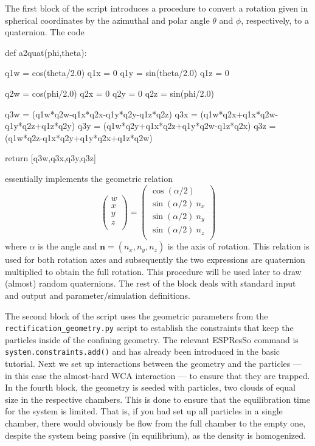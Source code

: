 \documentclass[aip,jcp,reprint,a4paper,onecolumn,amsmath]{revtex4-1}
\newcommand\code{\lstinline}
\newcommand{\es}{\mbox{\textsf{ESPResSo}}\xspace}
\newcommand\codees{\lstinline[language=python]}
\begin{document}
The first block of the script introduces a procedure to convert a rotation given in spherical coordinates by the azimuthal and polar angle $\theta$ and $\phi$, respectively, to a quaternion. The code
\begin{espresso}
def a2quat(phi,theta):

    q1w = cos(theta/2.0)
    q1x = 0
    q1y = sin(theta/2.0)
    q1z = 0

    q2w = cos(phi/2.0)
    q2x = 0
    q2y = 0
    q2z = sin(phi/2.0)

    q3w = (q1w*q2w-q1x*q2x-q1y*q2y-q1z*q2z)
    q3x = (q1w*q2x+q1x*q2w-q1y*q2z+q1z*q2y)
    q3y = (q1w*q2y+q1x*q2z+q1y*q2w-q1z*q2x)
    q3z = (q1w*q2z-q1x*q2y+q1y*q2x+q1z*q2w)

    return [q3w,q3x,q3y,q3z]
\end{espresso}
essentially implements the geometric relation
\begin{equation}
  \begin{pmatrix}
    w \\ x \\ y \\ z \\
  \end{pmatrix}
  =
  \begin{pmatrix}
    \cos(\alpha/2) \\
    \sin(\alpha/2)\ n_x \\
    \sin(\alpha/2)\ n_y \\
    \sin(\alpha/2)\ n_z \\
  \end{pmatrix}
\end{equation}
where $\alpha$ is the angle and $\mathbf{n} = (n_x,n_y,n_z)$ is the
axis of rotation. This relation is used for both rotation axes and subsequently the two expressions are quaternion multiplied to obtain the full rotation. This procedure will be used later to draw (almost) random quaternions. The rest of the block deals with standard input and output and parameter/simulation definitions.

The second block of the script uses the geometric parameters from the \code{rectification_geometry.py} script to establish the constraints that keep the particles inside of the confining geometry. The relevant \es{} command is \codees{system.constraints.add()} and has already been introduced in the basic tutorial. Next we set up interactions between the geometry and the particles --- in this case the almost-hard WCA interaction --- to ensure that they are trapped. In the fourth block, the geometry is seeded with particles, two clouds of equal size in the respective chambers. This is done to ensure that the equilibration time for the system is limited. That is, if you had set up all particles in a single chamber, there would obviously be flow from the full chamber to the empty one, despite the system being passive (in equilibrium), as the density is homogenized.
\end{document}
